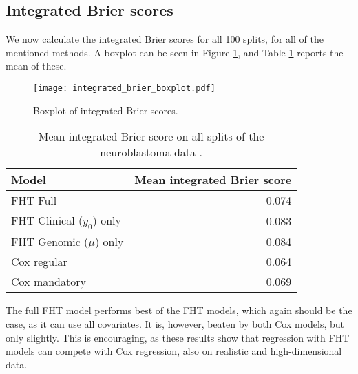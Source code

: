 


\subsection{Integrated Brier scores}
We now calculate the integrated Brier scores for all 100 splits, for all of the mentioned methods.
A boxplot can be seen in Figure \ref{fig:neuroblastoma-integrated-brier}, and Table \ref{tab:mean-brier} reports the mean of these.
\begin{figure}
\caption{Boxplot of integrated Brier scores.}
\label{fig:neuroblastoma-integrated-brier}
\centering
\texttt{[image: integrated\_brier\_boxplot.pdf]}
\end{figure}
\begin{table}
\caption{Mean integrated Brier score on all splits of the neuroblastoma data \citep{oberthuer-data}.}
\label{tab:mean-brier}
\centering
\begin{tabular}{lr}
\toprule
Model                      & Mean integrated Brier score \\
\hline
FHT Full                   & 0.074 \\
FHT Clinical ($y_0$) only  & 0.083 \\
FHT Genomic ($\mu$) only   & 0.084 \\
Cox regular                & 0.064 \\
Cox mandatory              & 0.069 \\
\bottomrule
\end{tabular}
\end{table}
The full FHT model performs best of the FHT models, which again should be the case, as it can use all covariates.
It is, however, beaten by both Cox models, but only slightly.
This is encouraging, as these results show that regression with FHT models can compete with Cox regression, also on realistic and high-dimensional data.